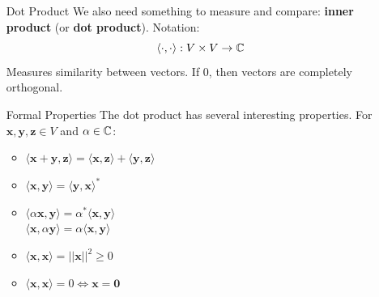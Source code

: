 \documentclass[11pt,a4paper]{article}
\begin{document}
\begin{itemize}
        \begin{multicols}{2}
            \begin{itemize}[font=\normalfont, nolistsep]
                \item $\mathbf{x}+\mathbf{y} = \mathbf{y}+\mathbf{x}$
                \item $(\mathbf{x}+\mathbf{y}) + \mathbf{z} = \mathbf{x}+(\mathbf{x}+\mathbf{y})$
                \item $\alpha(\mathbf{x}+\mathbf{y}) = \alpha\mathbf{x} + \alpha\mathbf{y}$
                \item $(\alpha+ \beta)\mathbf{x} = \alpha\mathbf{x} + \beta\mathbf{x}$
                \item $\alpha(\beta\mathbf{x}) = (\alpha\beta)\mathbf{x}$
                \item $\exists 0 \in V | \mathbf{x} + 0 = 0+\mathbf{x} = \mathbf{x}$
                \item $\forall \mathbf{x} \in V \exists(-\mathbf{x}) | x+(- \mathbf{x}) = 0$
            \end{itemize}
        \end{multicols}
    \item[Dot Product]We also need something to measure and compare: \textbf{inner product} (or \textbf{dot product}). Notation: 
        \[\langle\cdot,\cdot\rangle : V\times V \to \mathbb{C}\]
        Measures similarity between vectors. If 0, then vectors are completely orthogonal.
    \item[Formal Properties]The dot product has several interesting properties. For $\mathbf{x},\mathbf{y},\mathbf{z} \in V$ and $\alpha\in\mathbb{C}$:
    \begin{multicols}{2}
        \begin{itemize}
            \item $\langle\mathbf{x}+\mathbf{y},\mathbf{z}\rangle = \langle\mathbf{x},\mathbf{z}\rangle + \langle\mathbf{y},\mathbf{z}\rangle$
            \item $\langle\mathbf{x},\mathbf{y}\rangle = \langle\mathbf{y},\mathbf{x}\rangle^*$
            \item $\langle\alpha\mathbf{x},\mathbf{y}\rangle = \alpha^*\langle\mathbf{x},\mathbf{y}\rangle$\\
            $\langle\mathbf{x},\alpha\mathbf{y}\rangle = \alpha\langle\mathbf{x},\mathbf{y}\rangle$
            \item $\langle\mathbf{x},\mathbf{x}\rangle = ||\mathbf{x}||^2 \geq 0$
            \item $\langle\mathbf{x},\mathbf{x}\rangle = 0 \iff \mathbf{x} = \mathbf{0}$

\end{itemize}
\end{multicols}
\end{itemize}
\end{document}
